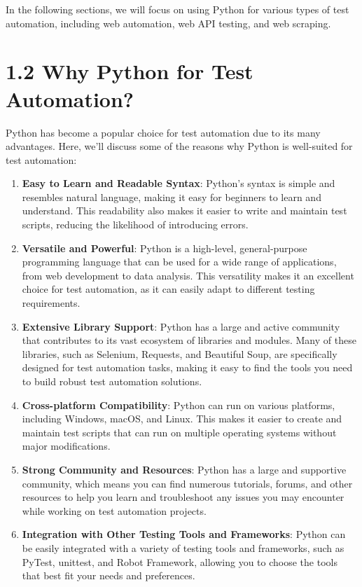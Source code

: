 \documentclass[
  paper=a4,
  ,captions=tableheading
]{scrartcl}
\begin{document}
In the following sections, we will focus on using Python for various
types of test automation, including web automation, web API testing, and
web scraping.

\hypertarget{why-python-for-test-automation}{%
\section{1.2 Why Python for Test
Automation?}\label{why-python-for-test-automation}}

Python has become a popular choice for test automation due to its many
advantages. Here, we'll discuss some of the reasons why Python is
well-suited for test automation:

\begin{enumerate}
\def\labelenumi{\arabic{enumi}.}
\item
  \textbf{Easy to Learn and Readable Syntax}: Python's syntax is simple
  and resembles natural language, making it easy for beginners to learn
  and understand. This readability also makes it easier to write and
  maintain test scripts, reducing the likelihood of introducing errors.
\item
  \textbf{Versatile and Powerful}: Python is a high-level,
  general-purpose programming language that can be used for a wide range
  of applications, from web development to data analysis. This
  versatility makes it an excellent choice for test automation, as it
  can easily adapt to different testing requirements.
\item
  \textbf{Extensive Library Support}: Python has a large and active
  community that contributes to its vast ecosystem of libraries and
  modules. Many of these libraries, such as Selenium, Requests, and
  Beautiful Soup, are specifically designed for test automation tasks,
  making it easy to find the tools you need to build robust test
  automation solutions.
\item
  \textbf{Cross-platform Compatibility}: Python can run on various
  platforms, including Windows, macOS, and Linux. This makes it easier
  to create and maintain test scripts that can run on multiple operating
  systems without major modifications.
\item
  \textbf{Strong Community and Resources}: Python has a large and
  supportive community, which means you can find numerous tutorials,
  forums, and other resources to help you learn and troubleshoot any
  issues you may encounter while working on test automation projects.
\item
  \textbf{Integration with Other Testing Tools and Frameworks}: Python
  can be easily integrated with a variety of testing tools and
  frameworks, such as PyTest, unittest, and Robot Framework, allowing
  you to choose the tools that best fit your needs and preferences.
\end{enumerate}
\end{document}
